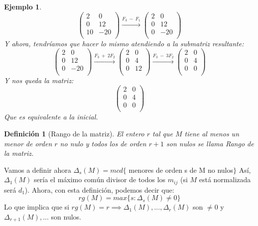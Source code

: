\documentclass[11pt, a4paper, titlepage]{article}
\theoremstyle{theorem-style}
\theoremstyle{definition-style}
\newtheorem*{ndef}{Definición}
\theoremstyle{remark-style}
\theoremstyle{example-style}
\newtheorem*{ejemplo}{Ejemplo}
\begin{document}
\begin{ejemplo}
\[\begin{pmatrix}
 2 & 0 \\
 0 & 12\\
 10 & -20\\ 
\end{pmatrix} \xrightarrow{F_3\ -\ F_1}  
\begin{pmatrix}
 2 & 0 \\
 0 & 12\\
 0 & -20\\ 
\end{pmatrix} 
	\]
	Y ahora, tendríamos que hacer lo mismo atendiendo a la submatriz resultante:
	\[
	\begin{pmatrix}
 2 & 0 \\
 0 & 12 \\
 0 & -20 \\ 
\end{pmatrix}\xrightarrow{F_3\ +\ 2F_2} 
\begin{pmatrix}
  2 & 0 \\
  0 & 4 \\
  0 & 12 \\ 
\end{pmatrix}\xrightarrow{F_3\ -\ 3F_2}
\begin{pmatrix}
  2 & 0 \\
  0 & 4 \\
  0 & 0 \\ 
\end{pmatrix}  
	\]
	Y nos queda la matriz:
	\[
	\begin{pmatrix}
 2 & 0 \\
 0 & 4\\
 0 & 0\\ 
\end{pmatrix} 
	\]
	Que es equivalente a la inicial.
\end{ejemplo}

\begin{ndef}[Rango de la matriz]
	El entero $r$ tal que $M$ tiene al menos un menor de orden $r$ no nulo y todos los de orden $r+1$ son nulos se llama Rango de la matriz.
\end{ndef} 

Vamos a definir ahora $\Delta_s(M) = mcd\{$ menores de orden s de M no nulos$\}$
Así, $\Delta_1(M)$ sería el máximo común divisor de todos los $m_{ij}$ (si $M$ está normalizada será $d_1$). Ahora, con esta definición, podemos decir que:
\[
rg(M) = max\{s : \Delta_s(M) \ne 0\}
\]
Lo que implica que si $rg(M) = r \implies \Delta_1(M),...,\Delta_r(M)$ son $\ne 0$ y $\Delta_{r+1}(M),...$ son nulos.
\end{document}
